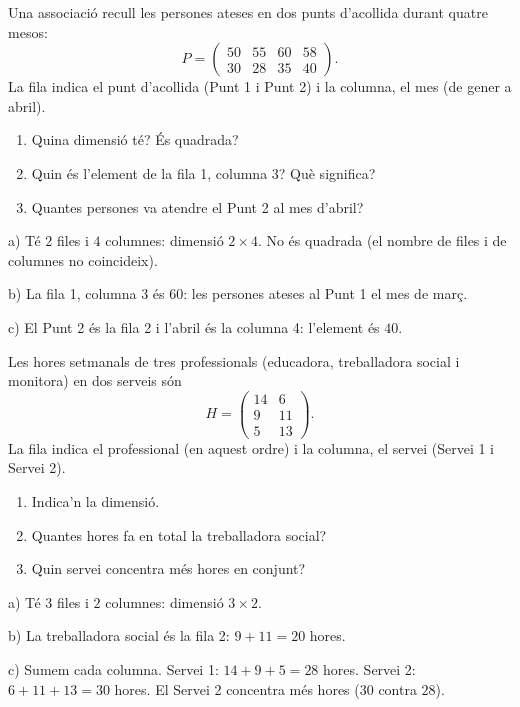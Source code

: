 \begin{exresolt}
Una associació recull les persones ateses en dos punts d'acollida durant quatre
mesos:
\[
P=\begin{pmatrix} 50 & 55 & 60 & 58 \\ 30 & 28 & 35 & 40 \end{pmatrix}.
\]
La fila indica el punt d'acollida (Punt 1 i Punt 2) i la columna, el mes
(de gener a abril).
\begin{enumerate}[label=\alph*), leftmargin=1.6em, topsep=2pt]
  \item Quina dimensió té? És quadrada?
  \item Quin és l'element de la fila 1, columna 3? Què significa?
  \item Quantes persones va atendre el Punt 2 al mes d'abril?
\end{enumerate}
\solucio
a) Té $2$ files i $4$ columnes: dimensió $2\times 4$. No és quadrada (el nombre de
files i de columnes no coincideix).

b) La fila 1, columna 3 és $60$: les persones ateses al Punt 1 el mes de març.

c) El Punt 2 és la fila 2 i l'abril és la columna 4: l'element és $40$.
\end{exresolt}

\begin{exresolt}
Les hores setmanals de tres professionals (educadora, treballadora social i
monitora) en dos serveis són
\[
H=\begin{pmatrix} 14 & 6 \\ 9 & 11 \\ 5 & 13 \end{pmatrix}.
\]
La fila indica el professional (en aquest ordre) i la columna, el servei
(Servei 1 i Servei 2).
\begin{enumerate}[label=\alph*), leftmargin=1.6em, topsep=2pt]
  \item Indica'n la dimensió.
  \item Quantes hores fa en total la treballadora social?
  \item Quin servei concentra més hores en conjunt?
\end{enumerate}
\solucio
a) Té $3$ files i $2$ columnes: dimensió $3\times 2$.

b) La treballadora social és la fila 2: $9 + 11 = 20$ hores.

c) Sumem cada columna. Servei 1: $14 + 9 + 5 = 28$ hores. Servei 2:
$6 + 11 + 13 = 30$ hores. El Servei 2 concentra més hores ($30$ contra $28$).
\end{exresolt}

